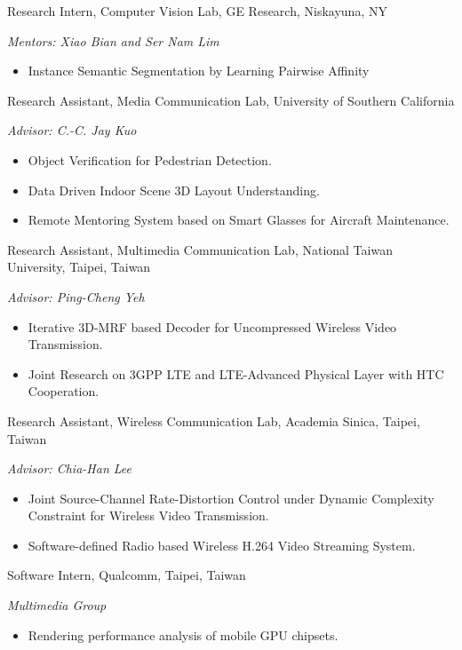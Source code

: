 \documentclass[11pt,letterpaper,sans]{moderncv} %
\begin{document}
%
{Research Intern, Computer Vision Lab, GE Research, Niskayuna, NY}
{}{}{}
{
	\textit{Mentors: Xiao Bian and Ser Nam Lim}
	\begin{itemize}
		\item Instance Semantic Segmentation by Learning Pairwise Affinity
	\end{itemize}
}



%
{Research Assistant, Media Communication Lab, University of Southern California}
{}{}{}
{
	\textit{Advisor: C.-C. Jay Kuo}
	\begin{itemize}
		\item Object Verification for Pedestrian Detection.
		\item Data Driven Indoor Scene 3D Layout Understanding.
		\item Remote Mentoring System based on Smart Glasses for Aircraft Maintenance.
	\end{itemize}
}



%
{Research Assistant, Multimedia Communication Lab, National Taiwan University, Taipei, Taiwan}
{}{}{}
{
	\textit{Advisor: Ping-Cheng Yeh}
	\begin{itemize}
		\item Iterative 3D-MRF based Decoder for Uncompressed Wireless Video Transmission.
		\item Joint Research on 3GPP LTE and LTE-Advanced Physical Layer with HTC Cooperation.
	\end{itemize}
}


%
{Research Assistant, Wireless Communication Lab, Academia Sinica, Taipei, Taiwan}
{}{}{}
{
	\textit{Advisor: Chia-Han Lee}
	\begin{itemize}
		\item Joint Source-Channel Rate-Distortion Control under Dynamic Complexity Constraint for Wireless Video Transmission.
		\item Software-defined Radio based Wireless H.264 Video Streaming System.
	\end{itemize}
}

%
{Software Intern, Qualcomm, Taipei, Taiwan}
{}{}{}
{
	\textit{Multimedia Group}
	\begin{itemize}
		\item Rendering performance analysis of mobile GPU chipsets.
	\end{itemize}
}
\end{document}
